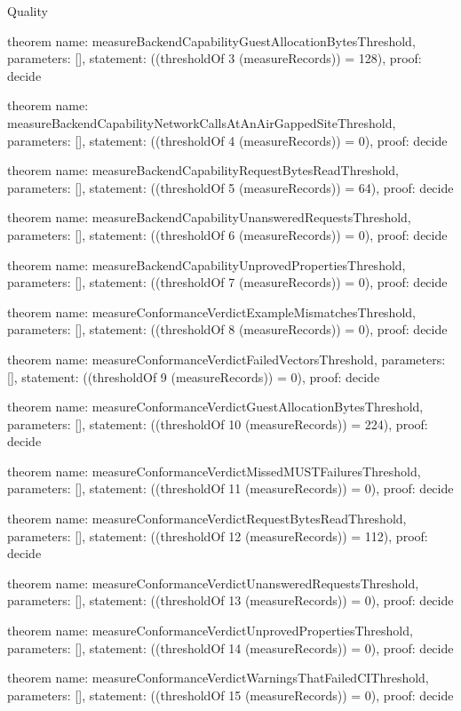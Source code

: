 \begin{lexlean}{Quality}
\begin{semanticmodule}
theorem{
  name: measureBackendCapabilityGuestAllocationBytesThreshold,
  parameters: [],
  statement: ((thresholdOf 3 (measureRecords)) = 128),
  proof: decide{}
}

theorem{
  name: measureBackendCapabilityNetworkCallsAtAnAirGappedSiteThreshold,
  parameters: [],
  statement: ((thresholdOf 4 (measureRecords)) = 0),
  proof: decide{}
}

theorem{
  name: measureBackendCapabilityRequestBytesReadThreshold,
  parameters: [],
  statement: ((thresholdOf 5 (measureRecords)) = 64),
  proof: decide{}
}

theorem{
  name: measureBackendCapabilityUnansweredRequestsThreshold,
  parameters: [],
  statement: ((thresholdOf 6 (measureRecords)) = 0),
  proof: decide{}
}

theorem{
  name: measureBackendCapabilityUnprovedPropertiesThreshold,
  parameters: [],
  statement: ((thresholdOf 7 (measureRecords)) = 0),
  proof: decide{}
}

theorem{
  name: measureConformanceVerdictExampleMismatchesThreshold,
  parameters: [],
  statement: ((thresholdOf 8 (measureRecords)) = 0),
  proof: decide{}
}

theorem{
  name: measureConformanceVerdictFailedVectorsThreshold,
  parameters: [],
  statement: ((thresholdOf 9 (measureRecords)) = 0),
  proof: decide{}
}

theorem{
  name: measureConformanceVerdictGuestAllocationBytesThreshold,
  parameters: [],
  statement: ((thresholdOf 10 (measureRecords)) = 224),
  proof: decide{}
}

theorem{
  name: measureConformanceVerdictMissedMUSTFailuresThreshold,
  parameters: [],
  statement: ((thresholdOf 11 (measureRecords)) = 0),
  proof: decide{}
}

theorem{
  name: measureConformanceVerdictRequestBytesReadThreshold,
  parameters: [],
  statement: ((thresholdOf 12 (measureRecords)) = 112),
  proof: decide{}
}

theorem{
  name: measureConformanceVerdictUnansweredRequestsThreshold,
  parameters: [],
  statement: ((thresholdOf 13 (measureRecords)) = 0),
  proof: decide{}
}

theorem{
  name: measureConformanceVerdictUnprovedPropertiesThreshold,
  parameters: [],
  statement: ((thresholdOf 14 (measureRecords)) = 0),
  proof: decide{}
}

theorem{
  name: measureConformanceVerdictWarningsThatFailedCIThreshold,
  parameters: [],
  statement: ((thresholdOf 15 (measureRecords)) = 0),
  proof: decide{}
}


\end{semanticmodule}
\end{lexlean}

